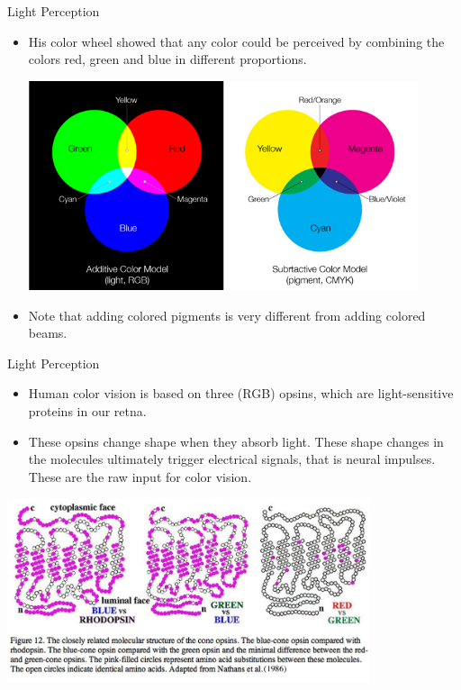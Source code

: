 \documentclass{beamer}
\begin{document}
\begin{frame}{Light Perception}
   \begin{itemize}
      \item His color wheel showed that any color could be perceived by combining the colors red, green and blue in different proportions.
      \begin{center}
         \includegraphics[width=0.9\textwidth]{figures/colors.jpg}
      \end{center}
      \item Note that adding colored pigments is very different from adding colored beams.
   \end{itemize}
\end{frame}

\begin{frame}{Light Perception}
   \begin{itemize}
      \item Human color vision is based on three (RGB) opsins, which are light-sensitive proteins in our retna.
      \item These opsins change shape when they absorb light. These shape changes in the molecules ultimately trigger electrical signals, that is neural impulses. These are the raw input for color vision.
   \end{itemize}
   \begin{center}
      \includegraphics[width=0.8\textwidth]{figures/opsins.jpeg}
   \end{center}
\end{frame}
\end{document}
